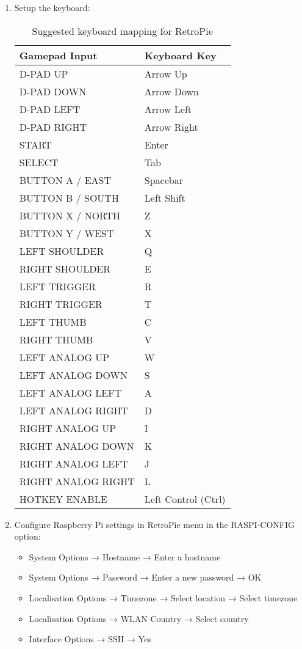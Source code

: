 \begin{enumerate}
\item Setup the keyboard:
\begin{table}[H]
\centering
\begin{tabular}{|l|l|}
\hline
\textbf{Gamepad Input} & \textbf{Keyboard Key} \\
\hline
D-PAD UP & Arrow Up \\
D-PAD DOWN & Arrow Down \\
D-PAD LEFT & Arrow Left \\
D-PAD RIGHT & Arrow Right \\
\hline
START & Enter \\
SELECT & Tab \\
BUTTON A / EAST & Spacebar \\
BUTTON B / SOUTH & Left Shift \\
BUTTON X / NORTH & Z \\
BUTTON Y / WEST & X \\
\hline
LEFT SHOULDER & Q \\
RIGHT SHOULDER & E \\
LEFT TRIGGER & R \\
RIGHT TRIGGER & T \\
LEFT THUMB & C \\
RIGHT THUMB & V \\
\hline
LEFT ANALOG UP & W \\
LEFT ANALOG DOWN & S \\
LEFT ANALOG LEFT & A \\
LEFT ANALOG RIGHT & D \\
RIGHT ANALOG UP & I \\
RIGHT ANALOG DOWN & K \\
RIGHT ANALOG LEFT & J \\
RIGHT ANALOG RIGHT & L \\
\hline
HOTKEY ENABLE & Left Control (Ctrl) \\
\hline
\end{tabular}
\caption{Suggested keyboard mapping for RetroPie}
\end{table}

\item Configure Raspberry Pi settings in RetroPie menu in the RASPI-CONFIG option:
\begin{itemize}
\item System Options → Hostname → Enter a hostname
\item System Options → Password → Enter a new password → OK
\item Localisation Options → Timezone → Select location → Select timezone
\item Localisation Options → WLAN Country → Select country
\item Interface Options → SSH → Yes
\end{itemize}


\end{enumerate}
